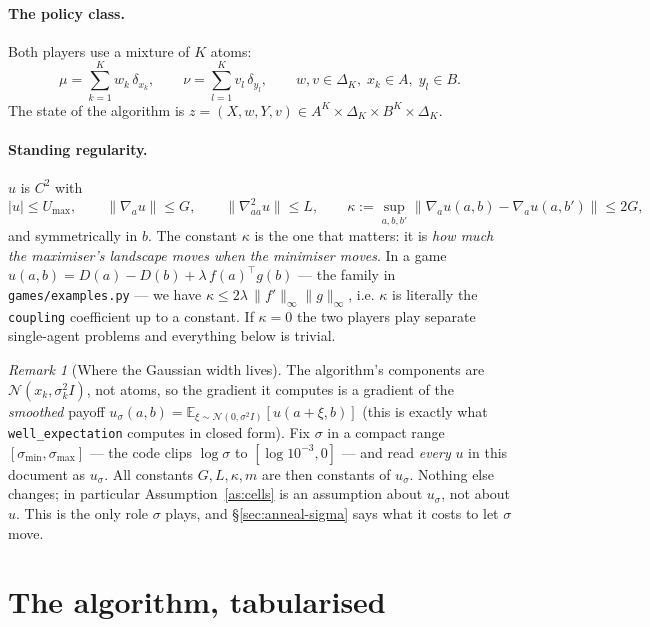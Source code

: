 \documentclass[11pt,a4paper]{article}
\theoremstyle{plain}
\theoremstyle{definition}
\theoremstyle{remark}
\newtheorem{remark}[theorem]{Remark}
\newcommand{\E}{\mathbb{E}}
\newcommand{\simplex}{\Delta}
\newcommand{\norm}[1]{\lVert #1 \rVert}
\newcommand{\abs}[1]{\lvert #1 \rvert}
\begin{document}
\paragraph{The policy class.} Both players use a mixture of $K$ atoms:
\[
\mu=\sum_{k=1}^K w_k\,\delta_{x_k},\qquad
\nu=\sum_{l=1}^K v_l\,\delta_{y_l},\qquad w,v\in\simplex_K,\; x_k\in A,\; y_l\in B .
\]
The state of the algorithm is $z=(X,w,Y,v)\in A^K\times\simplex_K\times B^K\times\simplex_K$.

\paragraph{Standing regularity.} $u$ is $C^2$ with
\[
\abs{u}\le U_{\max},\qquad
\norm{\nabla_a u}\le G,\qquad
\norm{\nabla^2_{aa} u}\le L,\qquad
\kappa:=\sup_{a,b,b'}\norm{\nabla_a u(a,b)-\nabla_a u(a,b')}\le 2G ,
\]
and symmetrically in $b$. The constant $\kappa$ is the one that matters: it is
\emph{how much the maximiser's landscape moves when the minimiser moves}. In a game
$u(a,b)=D(a)-D(b)+\lambda\,f(a)^\top g(b)$ --- the family in \texttt{games/examples.py}
--- we have $\kappa\le 2\lambda\,\norm{f'}_\infty\norm{g}_\infty$, i.e. $\kappa$ is
literally the \texttt{coupling} coefficient up to a constant. If $\kappa=0$ the two
players play separate single-agent problems and everything below is trivial.

\begin{remark}[Where the Gaussian width lives]\label{rem:sigma}
The algorithm's components are $\mathcal N(x_k,\sigma_k^2 I)$, not atoms, so the
gradient it computes is a gradient of the \emph{smoothed} payoff
$u_\sigma(a,b) = \E_{\xi\sim\mathcal N(0,\sigma^2 I)}[u(a+\xi,b)]$
(this is exactly what \texttt{well\_expectation} computes in closed form).
Fix $\sigma$ in a compact range $[\sigma_{\min},\sigma_{\max}]$ --- the code clips
$\log\sigma$ to $[\log 10^{-3},0]$ --- and read \emph{every} $u$ in this document as
$u_\sigma$. All constants $G,L,\kappa,m$ are then constants of $u_\sigma$. Nothing else
changes; in particular Assumption~\ref{as:cells} is an assumption about $u_\sigma$,
not about $u$. This is the only role $\sigma$ plays, and \S\ref{sec:anneal-sigma}
says what it costs to let $\sigma$ move.
\end{remark}

\section{The algorithm, tabularised}\label{sec:alg}
\end{document}
